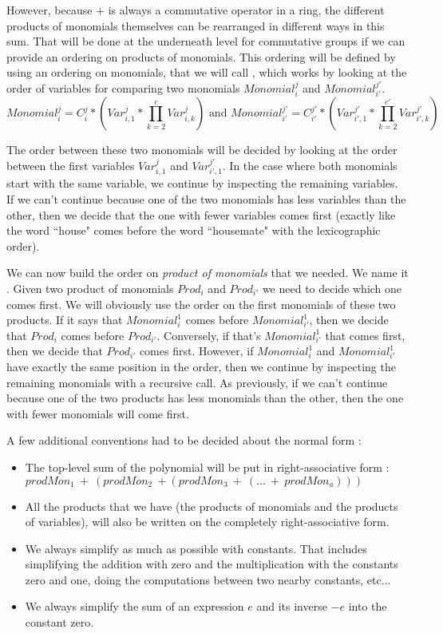 However, because $+$ is always a commutative operator in a ring, the different products of monomials themselves can be rearranged in different ways in this sum. That will be done at the underneath level for commutative groups if we can provide an ordering on products of monomials. This ordering will be defined by using an ordering on monomials, that we will call , which works by looking at the order of variables for comparing two monomials $Monomial_{i}^{j}$ and $Monomial_{i'}^{j'}$.
\[
Monomial_{i}^{j} = C_{i}^{j} * (Var_{i,1}^{j} * \prod_{k=2}^{c} Var_{i,k}^{j})
\text{ and }
Monomial_{i'}^{j'} = C_{i'}^{j'} * (Var_{i',1}^{j'} * \prod_{k=2}^{c'} Var_{i',k}^{j'})
\]

The order between these two monomials will be decided by looking at the order between the first variables $Var_{i,1}^{j}$ and $Var_{i',1}^{j'}$. In the case where both monomials start with the same variable, we continue by inspecting the remaining variables. If we can't continue because one of the two monomials has less variables than the other, then we decide that the one with fewer variables comes first (exactly like the word ``house" comes before the word ``housemate" with the lexicographic order).

We can now build the order on \emph{product of monomials} that we needed. We name it . Given two product of monomials $Prod_{i}$ and $Prod_{i'}$ we need to decide which one comes first. We will obviously use the order  on the first monomials of these two products. If it says that $Monomial_{i}^{1}$ comes before $Monomial_{i'}^{1}$, then we decide that $Prod_{i}$ comes before $Prod_{i'}$. Conversely, if that's $Monomial_{i'}^{1}$ that comes first, then we decide that $Prod_{i'}$ comes first. However, if $Monomial_{i}^{1}$ and $Monomial_{i'}^{1}$ have exactly the same position in the order, then we continue by inspecting the remaining monomials with a recursive call. As previously, if we can't continue because one of the two products has less monomials than the other, then the one with fewer monomials will come first.

A few additional conventions had to be decided about the normal form :
\begin{itemize}

\item The top-level sum of the polynomial will be put in right-associative form : \\
$prodMon_1\ +\ (prodMon_2\ + (prodMon_3\ +\ (...\ +\ prodMon_a)))$
\item All the products that we have (the products of monomials and the products of variables), will also be written on the completely right-associative form.
\item We always simplify as much as possible with constants. That includes simplifying the addition with zero and the multiplication with the constants zero and one, doing the computations between two nearby constants, etc...
\item We always simplify the sum of an expression $e$ and its inverse $-e$ into the constant zero. 

\end{itemize}

